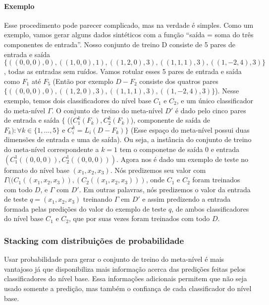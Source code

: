 \documentclass[]{article}
\begin{document}
\paragraph{Exemplo}\label{exemplo}

Esse procedimento pode parecer complicado, mas na verdade é simples.
Como um exemplo, vamos gerar alguns dados sintéticos com a função
``saída = soma do três componentes de entrada''. Nosso conjunto de
treino D consiste de 5 pares de entrada e saída
\(\{((0,0,0),0), ((1,0,0),1), ((1,2,0),3), ((1,1,1),3), ((1,-2,4),3)\}\),
todas as entradas sem ruídos. Vamos rotular esses 5 pares de entrada e
saída como \(F_1\) até \(F_5\) (Então por exemplo \(D - F_2\) consiste
dos quatros pares
\(\{((0,0,0),0), ((1,2,0),3), ((1,1,1),3), ((1,-2,4),3)\}\)). Nesse
exemplo, temos dois classificadores do nível base \(C_1\) e \(C_2\), e
um único classificador do meta-nível \(\Gamma\). O conjunto de treino do
meta-nível \(D'\) é dado pelo cinco pares de entrada e saída \(\{\)
((\(C_1^k(F_k), C_2^k(F_k)\)), componente de saída de
\(F_k) : \forall k \in \{1,...,5\}\) e \(C_i^k = L_i(D-F_k)\}\) (Esse
espaço do meta-nível possui duas dimensões de entrada e uma de saída).
Ou seja, a instância do conjunto de treino do meta-nível correspondente
a \(k = 1\) tem o componetne de saída 0 e entrada
\((C_1^1((0,0,0)), C_2^1((0,0,0)))\). Agora nos é dado um exemplo de
teste no formato do nível base \((x_1, x_2, x_3)\). Nós predizemos seu
valor com \(\Gamma((C_1((x_1, x_2, x_3)), (C_2((x_1, x_2, x_3)))\), onde
\(C_1\) e \(C_2\) foram treinados com todo \(D\), e \(\Gamma\) com
\(D'\). Em outras palavras, nós predizemos o valor da entrada de teste
\(q = (x_1, x_2, x_3)\) treinando \(\Gamma\) em \(D'\) e assim
predizendo a entrada formada pelas predições do valor do exemplo de
teste \(q\), de ambos classificadores do nível base \(C_1\) e \(C_2\),
que por suas vezes foram treinados com todo \(D\).

\subsubsection{Stacking com distribuições de
probabilidade}\label{stacking-com-distribuicoes-de-probabilidade}

Usar probabilidade para gerar o conjunto de treino do meta-nível é mais
vantajoso já que disponibiliza mais informação acerca das predições
feitas pelos classificadores do nível base. Essa informações adicionais
permitem que não seja usado somente a predição, mas também o confiança
de cada classificador do nível base.
\end{document}
